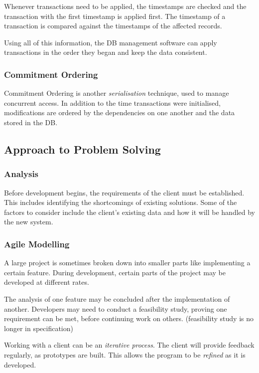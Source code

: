 \documentclass[10pt]{article}
\begin{document}
Whenever transactions need to be applied, the timestamps are checked and the transaction with the first timestamp is applied first. The timestamp of a transaction is compared against the timestamps of the affected records.

Using all of this information, the DB management software can apply transactions in the order they began and keep the data consistent.

\subsubsection{Commitment Ordering}
\label{sec:org59b4fef}

Commitment Ordering is another \emph{serialisation} technique, used to manage concurrent access. In addition to the time transactions were initialised, modifications are ordered by the dependencies on one another and the data stored in the DB.

\subsection{Approach to Problem Solving}
\label{sec:orgb638288}
\subsubsection{Analysis}
\label{sec:org7490877}

Before development begins, the requirements of the client must be established. This includes identifying the shortcomings of existing solutions. Some of the factors to consider include the client's existing data and how it will be handled by the new system.

\subsubsection{Agile Modelling}
\label{sec:orgdb32825}

A large project is sometimes broken down into smaller parts like implementing a certain feature. During development, certain parts of the project may be developed at different rates.

The analysis of one feature may be concluded after the implementation of another. Developers may need to conduct a feasibility study, proving one requirement can be met, before continuing work on others. (feasibility study is no longer in specification)

Working with a client can be an \emph{iterative process}. The client will provide feedback regularly, as prototypes are built. This allows the program to be \emph{refined} as it is developed.
\end{document}
